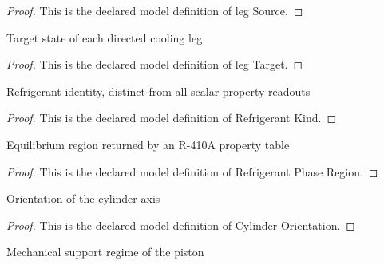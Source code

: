 \begin{proof}
  This is the declared model definition of leg Source.
\end{proof}
\begin{definition}
  \label{def:physics:phyx-mini-0462:phyxminiproblems-problemphyxmini0462-legtarget}
  Target state of each directed cooling leg
\end{definition}
\begin{proof}
  This is the declared model definition of leg Target.
\end{proof}
\begin{definition}
  \label{def:physics:phyx-mini-0462:phyxminiproblems-problemphyxmini0462-refrigerantkind}
  Refrigerant identity, distinct from all scalar property readouts
\end{definition}
\begin{proof}
  This is the declared model definition of Refrigerant Kind.
\end{proof}
\begin{definition}
  \label{def:physics:phyx-mini-0462:phyxminiproblems-problemphyxmini0462-refrigerantphaseregion}
  Equilibrium region returned by an R-410A property table
\end{definition}
\begin{proof}
  This is the declared model definition of Refrigerant Phase Region.
\end{proof}
\begin{definition}
  \label{def:physics:phyx-mini-0462:phyxminiproblems-problemphyxmini0462-cylinderorientation}
  Orientation of the cylinder axis
\end{definition}
\begin{proof}
  This is the declared model definition of Cylinder Orientation.
\end{proof}
\begin{definition}
  \label{def:physics:phyx-mini-0462:phyxminiproblems-problemphyxmini0462-pistonsupportregime}
  Mechanical support regime of the piston
\end{definition}
